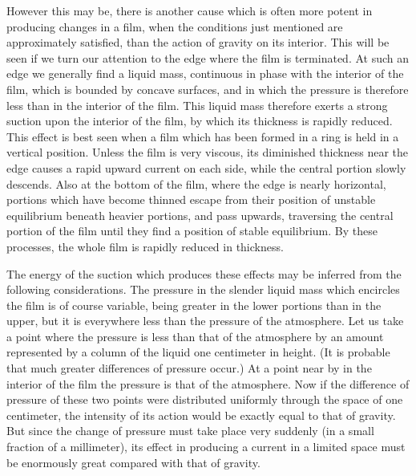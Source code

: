 \documentclass[12pt]{article}
\begin{document}
However this may be, there is another cause which is often more potent in producing changes in a film, when the conditions just mentioned are approximately satisfied, than the action of gravity on its interior. This will be seen if we turn our attention to the edge where the film is terminated. At such an edge we generally find a liquid mass, continuous in phase with the interior of the film, which is bounded by concave surfaces, and in which the pressure is therefore less than in the interior of the film. This liquid mass therefore exerts a strong suction upon the interior of the film, by which its thickness is rapidly reduced. This effect is best seen when a film which has been formed in a ring is held in a vertical position. Unless the film is very viscous, its diminished thickness near the edge causes a rapid upward current on each side, while the central portion slowly descends. Also at the bottom of the film, where the edge is nearly horizontal, portions which have become thinned escape from their position of unstable equilibrium beneath heavier portions, and pass upwards, traversing the central portion of the film until they find a position of stable equilibrium. By these processes, the whole film is rapidly reduced in thickness.

The energy of the suction which produces these effects may be inferred from the following considerations. The pressure in the slender liquid mass which encircles the film is of course variable, being greater in the lower portions than in the upper, but it is everywhere less than the pressure of the atmosphere. Let us take a point where the pressure is less than that of the atmosphere by an amount represented by a column of the liquid one centimeter in height. (It is probable that much greater differences of pressure occur.) At a point near by in the interior of the film the pressure is that of the atmosphere. Now if the difference of pressure of these two points were distributed uniformly through the space of one centimeter, the intensity of its action would be exactly equal to that of gravity. But since the change of pressure must take place very suddenly (in a small fraction of a millimeter), its effect in producing a current in a limited space must be enormously great compared with that of gravity.
\end{document}

